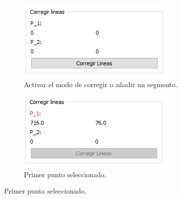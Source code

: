 \documentclass[13pt]{book}              %
\begin{document}
{\begin{figure}
	\begin{subfigure}[c]{.5\linewidth}
	\centering\large \includegraphics[width=.9\textwidth]{CorregirPaso1}
	\caption{Activar el modo de corregir o añadir un segmento.}\label{fig:CorregirPaso1}
	\end{subfigure}%
	\begin{subfigure}[c]{.5\linewidth}
	\centering\large \includegraphics[width=.9\textwidth]{punto1}
	\caption{Primer punto seleccionado.}\label{fig:punto1}
	\end{subfigure}%
	

\end{figure}}
\end{document}
